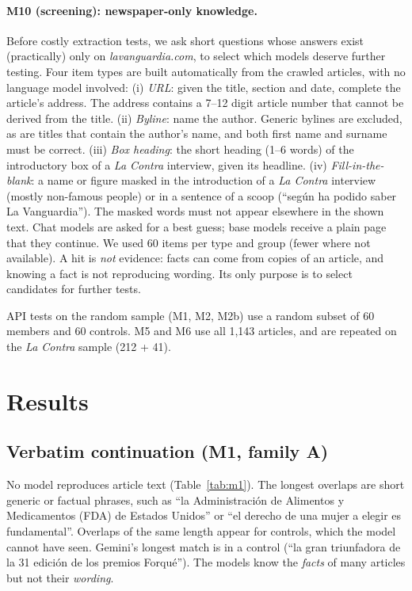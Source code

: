 \documentclass[10pt,a4paper]{article}
\begin{document}
\paragraph{M10 (screening): newspaper-only knowledge.} Before costly extraction tests, we ask short questions whose
answers exist (practically) only on \emph{lavanguardia.com}, to select which models deserve further testing. Four
item types are built automatically from the crawled articles, with no language model involved:
(i) \emph{URL}: given the title, section and date, complete the article's address. The address contains a 7--12 digit
article number that cannot be derived from the title.
(ii) \emph{Byline}: name the author. Generic bylines are excluded, as are titles that contain the author's name, and both first name and surname must be correct.
(iii) \emph{Box heading}: the short heading (1--6 words) of the introductory box of a \emph{La Contra} interview, given its headline.
(iv) \emph{Fill-in-the-blank}: a name or figure masked in the introduction of a \emph{La Contra} interview (mostly
non-famous people) or in a sentence of a scoop (``seg\'un ha podido saber La Vanguardia''). The masked words must not appear elsewhere in the shown text.
Chat models are asked for a best guess; base models receive a plain page that they continue. We used 60 items per type
and group (fewer where not available). A hit is \emph{not} evidence: facts can come from copies of an article, and
knowing a fact is not reproducing wording. Its only purpose is to select candidates for further tests.

API tests on the random sample (M1, M2, M2b) use a random subset of 60 members and 60 controls. M5 and M6 use all
1,143 articles, and are repeated on the \emph{La Contra} sample (212 + 41).

\section{Results}\label{sec:results}
\subsection{Verbatim continuation (M1, family A)}
No model reproduces article text (Table~\ref{tab:m1}). The longest overlaps are short generic or factual phrases,
such as ``la Administraci\'on de Alimentos y Medicamentos (FDA) de Estados Unidos'' or ``el derecho de una mujer a
elegir es fundamental''. Overlaps of the same length appear for controls, which the model cannot have seen. Gemini's
longest match is in a control (``la gran triunfadora de la 31\textordfeminine{} edici\'on de los premios Forqu\'e''). The
models know the \emph{facts} of many articles but not their \emph{wording}.
\end{document}
